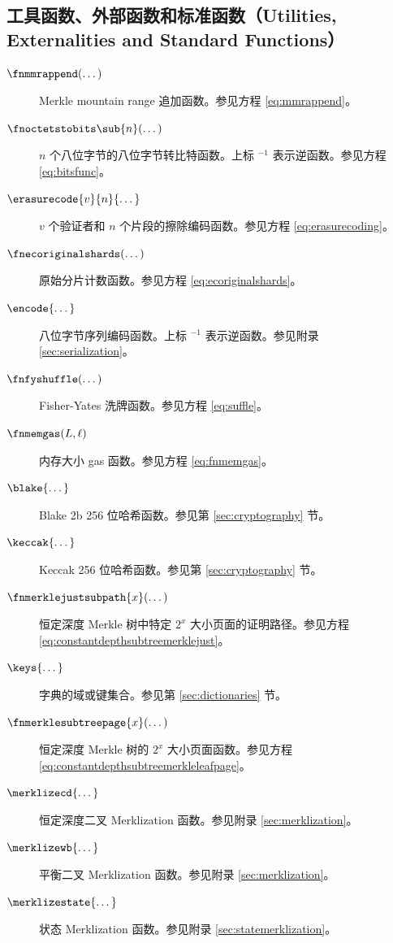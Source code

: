 \subsection{工具函数、外部函数和标准函数（Utilities, Externalities and Standard Functions）}

\begin{description}
  \item[$\fnmmrappend(\dots)$] Merkle mountain range 追加函数。参见方程 \ref{eq:mmrappend}。
  \item[$\fnoctetstobits\sub{n}(\dots)$] $n$ 个八位字节的八位字节转比特函数。上标 ${}^{-1}$ 表示逆函数。参见方程 \ref{eq:bitsfunc}。
  \item[$\erasurecode{v}{n}{\dots}$] $v$ 个验证者和 $n$ 个片段的擦除编码函数。参见方程 \ref{eq:erasurecoding}。
  \item[$\fnecoriginalshards(\dots)$] 原始分片计数函数。参见方程 \ref{eq:ecoriginalshards}。
  \item[$\encode{\dots}$] 八位字节序列编码函数。上标 ${}^{-1}$ 表示逆函数。参见附录 \ref{sec:serialization}。
  \item[$\fnfyshuffle(\dots)$] Fisher-Yates 洗牌函数。参见方程 \ref{eq:suffle}。
  \item[$\fnmemgas(L, \ell)$] 内存大小 gas 函数。参见方程 \ref{eq:fnmemgas}。
  \item[$\blake{\dots}$] Blake 2b 256 位哈希函数。参见第 \ref{sec:cryptography} 节。
  \item[$\keccak{\dots}$] Keccak 256 位哈希函数。参见第 \ref{sec:cryptography} 节。

  \item[$\fnmerklejustsubpath{x}(\dots)$] 恒定深度 Merkle 树中特定 $2^x$ 大小页面的证明路径。参见方程 \ref{eq:constantdepthsubtreemerklejust}。
  \item[$\keys{\dots}$] 字典的域或键集合。参见第 \ref{sec:dictionaries} 节。
  \item[$\fnmerklesubtreepage{x}(\dots)$] 恒定深度 Merkle 树的 $2^x$ 大小页面函数。参见方程 \ref{eq:constantdepthsubtreemerkleleafpage}。
  \item[$\merklizecd{\dots}$] 恒定深度二叉 Merklization 函数。参见附录 \ref{sec:merklization}。
  \item[$\merklizewb{\dots}$] 平衡二叉 Merklization 函数。参见附录 \ref{sec:merklization}。
  \item[$\merklizestate{\dots}$] 状态 Merklization 函数。参见附录 \ref{sec:statemerklization}。


\end{description}
